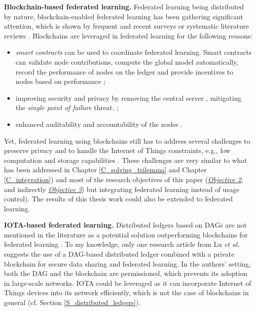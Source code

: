  \textbf{Blockchain-based federated learning.} Federated learning being distributed by nature, blockchain-enabled federated learning has been gathering significant attention, which is shown by frequent and recent surveys \cite{Lee2021, Issa2023, Qu2023} or systematic literature reviews \cite{Dongkun2021, Qammar2023}. Blockchains are leveraged in federated learning for the following reasons:
 
 \begin{itemize}
     \item \emph{smart contracts} can be used to coordinate federated learning. Smart contracts can validate node contributions, compute the global model automatically, record the performance of nodes on the ledger and provide incentives to nodes based on performance \cite{Issa2023};
     \item improving security and privacy by removing the  central server \cite{Issa2023}, mitigating the \emph{single point of failure} threat.  \cite{Yunlong2020};
     \item enhanced auditability and accountability of the nodes \cite{Issa2023}.
 \end{itemize}
 
 Yet, federated learning using blockchains still has to address several challenges to preserve privacy and to handle the Internet of Things constraints, e.g., low computation and storage capabilities \cite{Issa2023}. These challenges are very similar to what has been addressed in Chapter \ref{C_solving_trilemma} and Chapter \ref{C_integration}) and
 most of the research objectives of this paper (\hyperref[obj:23]{\emph{Objective 2}}, and indirectly \hyperref[obj:23]{\emph{Objective 3}}) but integrating federated learning instead of usage control). The results of this thesis work could also be extended to federated learning.
 
 \textbf{IOTA-based federated learning.} Distributed ledgers based on DAGs are not mentioned in the literature as a potential solution outperforming blockchains for federated learning \cite{Issa2023, Qu2023}. To my knowledge, only one research article from Lu \emph{et al.} \cite{Yunlong2020} suggests the use of a DAG-based distributed ledger combined with a private blockchain for secure data sharing and
 federated learning.  In the authors' setting, both the DAG and the blockchain are permissioned, which prevents its adoption in large-scale networks. IOTA could be leveraged as it can incorporate Internet of Things devices into its network efficiently, which is not the case of blockchains in general (cf. Section \ref{S_distributed_ledgers}).

